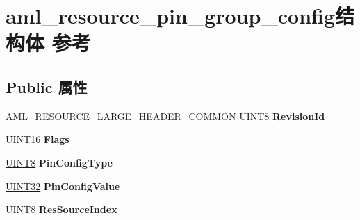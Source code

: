 \hypertarget{structaml__resource__pin__group__config}{}\section{aml\+\_\+resource\+\_\+pin\+\_\+group\+\_\+config结构体 参考}
\label{structaml__resource__pin__group__config}
\subsection*{Public 属性}
\begin{DoxyCompactItemize}
\item 
\mbox{\label{structaml__resource__pin__group__config_a8d1847bd5196535733ea2943c06a1779}} 
A\+M\+L\+\_\+\+R\+E\+S\+O\+U\+R\+C\+E\+\_\+\+L\+A\+R\+G\+E\+\_\+\+H\+E\+A\+D\+E\+R\+\_\+\+C\+O\+M\+M\+ON \hyperlink{_processor_bind_8h_ab27e9918b538ce9d8ca692479b375b6a}{U\+I\+N\+T8} {\bfseries Revision\+Id}
\item 
\mbox{\label{structaml__resource__pin__group__config_a6155d1f1db5ac435d31c6ff5902bf625}} 
\hyperlink{_processor_bind_8h_a09f1a1fb2293e33483cc8d44aefb1eb1}{U\+I\+N\+T16} {\bfseries Flags}
\item 
\mbox{\label{structaml__resource__pin__group__config_ae426e88d0c15c06383ee1d5138141a09}} 
\hyperlink{_processor_bind_8h_ab27e9918b538ce9d8ca692479b375b6a}{U\+I\+N\+T8} {\bfseries Pin\+Config\+Type}
\item 
\mbox{\label{structaml__resource__pin__group__config_a3ca0e3028e50952868978b97c4253285}} 
\hyperlink{_processor_bind_8h_ae1e6edbbc26d6fbc71a90190d0266018}{U\+I\+N\+T32} {\bfseries Pin\+Config\+Value}
\item 
\mbox{\label{structaml__resource__pin__group__config_a9bb59279b73af28ba700cf12e07d0706}} 
\hyperlink{_processor_bind_8h_ab27e9918b538ce9d8ca692479b375b6a}{U\+I\+N\+T8} {\bfseries Res\+Source\+Index}
\item 
\mbox{\label{structaml__resource__pin__group__config_a988d2f01f617641d0ee049398b7adffc}} 

\end{DoxyCompactItemize}
